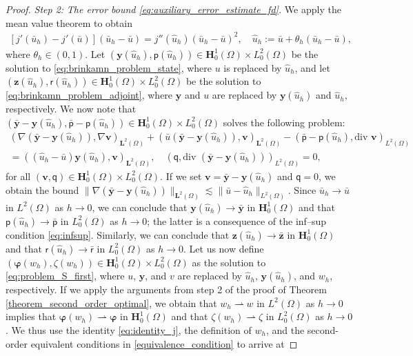 \documentclass[final]{siamart0216}
\begin{document}
\begin{proof}
\emph{Step 2:} \emph{The error bound \eqref{eq:auxiliary_error_estimate_fd}.} We apply the mean value theorem to obtain 
\begin{align}\label{eq:mean_value_theorem}
[j'(\bar{u}_h)-j'(\bar{u})](\bar{u}_h-\bar{u})=j''(\hat{u}_h)(\bar{u}_h-\bar{u})^2,\quad \hat{u}_h:=\bar{u}+\theta_h (\bar{u}_h - \bar{u}),
\end{align}
where $\theta_h \in (0,1)$. Let $(\mathbf{y}(\hat{u}_h),\mathsf{p}(\hat{u}_h))\in \mathbf{H}_0^1(\Omega)\times L_0^2(\Omega)$ be the solution to  \eqref{eq:brinkamn_problem_state}, where $u$ is replaced by $\hat{u}_h$, and let $(\mathbf{z}(\hat{u}_h),\mathsf{r}(\hat{u}_h))\in \mathbf{H}_0^1(\Omega)\times L_0^2(\Omega)$ be the solution to \eqref{eq:brinkamn_problem_adjoint}, where $\mathbf{y}$ and $u$ are replaced by $\mathbf{y}(\hat{u}_h)$ and $\hat{u}_h$, respectively.  We now note that $(\bar{\mathbf{y}}-\mathbf{y}(\hat{u}_h),\bar{\mathsf{p}}-\mathsf{p}(\hat{u}_h))\in\mathbf{H}_0^1(\Omega)\times L_0^2(\Omega)$ solves the following problem:
 \begin{multline*}
(\nabla (\bar{\mathbf{y}}-\mathbf{y}(\hat{u}_{h})),\nabla \mathbf{v})_{\mathbf{L}^2(\Omega)}+( \bar{u}(\bar{\mathbf{y}}-\mathbf{y}(\hat{u}_{h})), \mathbf{v})_{\mathbf{L}^2(\Omega)}-(\bar{\mathsf{p}}-\mathsf{p}(\hat{u}_{h}),\text{div }\mathbf{v})_{L^2(\Omega)} \\=((\hat{u}_{h}-\bar{u})\mathbf{y}(\hat{u}_{h}),\mathbf{v})_{\mathbf{L}^2(\Omega)},\quad (\mathsf{q},\text{div }(\bar{\mathbf{y}}-\mathbf{y}(\hat{u}_{h})))_{L^2(\Omega)}  =  0,
\end{multline*}
for all $(\mathbf{v},\mathsf{q}) \in \mathbf{H}_0^1(\Omega) \times L_0^2(\Omega)$. If we set $\mathbf{v} = \bar{\mathbf{y}}-\mathbf{y}(\hat{u}_{h})$ and $\mathsf{q}=0$, we obtain the bound $\|\nabla(\bar{\mathbf{y}}-\mathbf{y}(\hat{u}_{h}))\|_{\mathbf{L}^2(\Omega)}\lesssim \|\bar{u}-\hat{u}_{h}\|_{L^2(\Omega)}$. Since $\bar{u}_h \to \bar{u}$ in $L^2(\Omega)$ as $h \rightarrow 0$, we can conclude that $\mathbf{y}(\hat{u}_h)\to \bar{\mathbf{y}}$ in $\mathbf{H}_0^1(\Omega)$ and that $\mathsf{p}(\hat{u}_h)\to\bar{\mathsf{p}}$ in $L_0^2(\Omega)$ as $h \rightarrow 0$; the latter is a consequence of the inf--sup condition \eqref{eq:infsup}. Similarly, we can conclude that $\mathbf{z}(\hat{u}_h)\to \bar{\mathbf{z}}$ in $\mathbf{H}_0^1(\Omega)$ and that $\mathsf{r}(\hat{u}_h) \to \bar{\mathsf{r}}$ in $L_0^2(\Omega)$ as $h \rightarrow 0$. Let us now define $(\boldsymbol{\varphi}(w_h),\zeta(w_h))\in \mathbf{H}_0^1(\Omega)\times L_0^2(\Omega)$ as the solution to \eqref{eq:problem_S_first}, where $u$, $\mathbf{y}$, and $v$ are replaced by $\hat{u}_h$, $\mathbf{y}(\hat{u}_{h})$, and $w_h$, respectively. If we apply the arguments from step 2 of the proof of Theorem \ref{theorem_second_order_optimal}, we obtain that $w_h\rightharpoonup w$ in $L^2(\Omega)$ as $h \rightarrow 0$ implies that $\boldsymbol{\varphi}(w_h)\rightharpoonup \boldsymbol{\varphi}$ in $\mathbf{H}_0^1(\Omega)$ and that $\zeta(w_h)\rightharpoonup \zeta$ in $L_0^2(\Omega)$ as $h \rightarrow 0$. We thus use the identity \eqref{eq:identity_j}, the definition of $w_h$, and the second-order equivalent conditions in \eqref{equivalence_condition} to arrive at

\end{proof}
\end{document}
